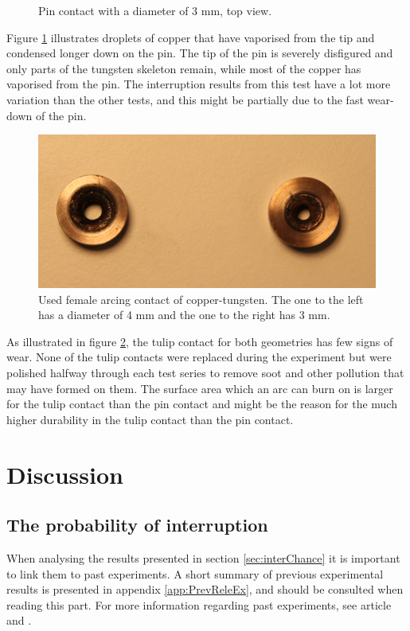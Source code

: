 \documentclass[10pt,a4paper,twoside]{article}
\begin{document}
\begin{figure}[H]
\begin{minipage}{.5\textwidth}
  \caption{Pin contact with a diameter of 3 mm, \newline top view.}
  \label{fig:d3_burn_top}
\end{minipage}
\end{figure}

Figure \ref{fig:d3_burn_top} illustrates droplets of copper that have vaporised from the tip and condensed longer down on the pin. The tip of the pin is severely disfigured and only parts of the tungsten skeleton remain, while most of the copper has vaporised from the pin. The interruption results from this test have a lot more variation than the other tests, and this might be partially due to the fast wear-down of the pin. 


\begin{figure}[H]
\centering
\includegraphics[scale=0.4]{Bilder/Discussion/femaleContacts4mmand3mm.png}
\caption{Used female arcing contact of copper-tungsten. The one to the left has a diameter of 4 mm and the one to the right has 3 mm.} \label{fig:used_d4_d3_female}
\end{figure}

As illustrated in figure \ref{fig:used_d4_d3_female}, the tulip contact for both geometries has few signs of wear. None of the tulip contacts were replaced during the experiment but were polished halfway through each test series to remove soot and other pollution that may have formed on them. The surface area which an arc can burn on is larger for the tulip contact than the pin contact and might be the reason for the much higher durability in the tulip contact than the pin contact.

\cleardoublepage

\section{Discussion}
\subsection{The probability of interruption} \label{sec:DiscIntChan}
When analysing the results presented in section \ref{sec:interChance} it is important to link them to past experiments. A short summary of previous experimental results is presented in appendix \ref{app:PrevReleEx}, and should be consulted when reading this part. For more information regarding past experiments, see article \cite{bib:CIAMVLBS} and \cite{bib:AFIMVLBA}.
\end{document}
